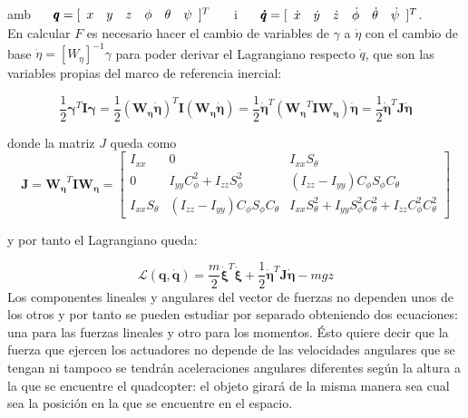 \documentclass[twoside,11pt]{book}
\begin{document}
amb $ \hspace{0.5cm} \pmb{q}=[\begin{array}{cccccc}
x & y & z & \phi & \theta & \psi
\end{array} ]^{T} \hspace{0.5cm}$ i $ \hspace{0.5cm} \pmb{\dot{q}}=[\begin{array}{cccccc}
\dot{x} & \dot{y} & \dot{z} & \dot{\phi} & \dot{\theta} & \dot{\psi}
\end{array} ]^{T}$.\\

En calcular $F$ es necesario hacer el cambio de variables de $\gamma$ a $\dot{\eta}$ con el cambio de base $\dot{\eta}=\left[ W_\eta \right]^{-1} \gamma$ para poder derivar el Lagrangiano respecto $\dot{q}$, que son las variables propias del marco de referencia inercial:

\begin{equation}
\frac{1}{2}\pmb{\gamma}^{T}\pmb{I}\pmb{\gamma} = \frac{1}{2}(\pmb{W_\eta} \pmb{\dot{\eta}})^{T}\pmb{I}(\pmb{W_\eta} \pmb{\dot{\eta}}) = \frac{1}{2}\pmb{\dot{\eta}}^{T}(\pmb{W_\eta} ^{T}\pmb{I}\pmb{W_\eta})\pmb{\dot{\eta}} = \frac{1}{2}\pmb{\dot{\eta}}^{T}\pmb{J}\pmb{\dot{\eta}}
\end{equation}

donde la matriz $J$ queda como
\begin{equation}
\pmb{J}=\pmb{W_\eta} ^{T}\pmb{I}\pmb{W_\eta} = \left[ \begin{array}{ccc}
I_{xx} & 0 & I_{xx} S_\theta \\
0 & I_{yy} C^2_\phi + I_{zz} S^2_\phi & (I_{zz}-I_{yy}) C_{\phi} S_\phi C_\theta \\
I_{xx} S_\theta & (I_{zz}-I_{yy}) C_{\phi} S_\phi C_\theta & I_{xx} S^2_{\theta}+I_{yy} S^2_{\phi} C^2_\theta +I_{zz}C^2_{\phi} C^2_{\theta}
\end{array} \right]
\end{equation} 

y por tanto el Lagrangiano queda:

\begin{equation}
\mathcal{L}(\pmb{q},\pmb{\dot{q}})=\frac{m}{2} \pmb{\dot{\xi}}^T \pmb{\dot{\xi}} + \frac{1}{2}\pmb{\dot{\eta}}^{T}\pmb{J}\pmb{\dot{\eta}} - mgz
\end{equation}
Los componentes lineales y angulares del vector de fuerzas no dependen unos de los otros y por tanto se pueden estudiar por separado obteniendo dos ecuaciones: una para las fuerzas lineales y otro para los momentos. Ésto quiere decir que la fuerza que ejercen los actuadores no depende de las velocidades angulares que se tengan ni tampoco se tendrán aceleraciones angulares diferentes según la altura a la que se encuentre el quadcopter: el objeto girará de la misma manera sea cual sea la  posición en la que se encuentre en el espacio.
\end{document}
